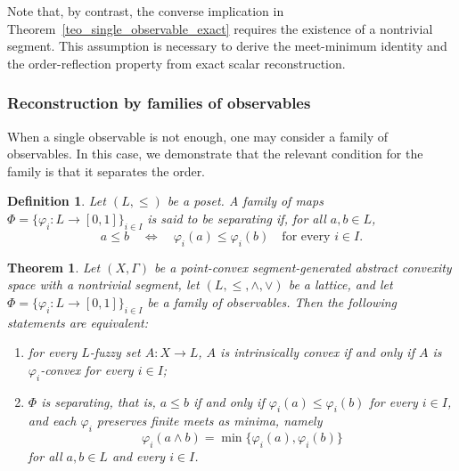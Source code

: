 \documentclass[11pt,a4paper]{article}
\newtheorem{theorem}{Theorem}
\newtheorem{definition}{Definition}
\begin{document}
Note that, by contrast, the converse implication in Theorem~\ref{teo_single_observable_exact} requires the existence of a nontrivial segment. This assumption is necessary to derive the meet-minimum identity and the order-reflection property from exact scalar reconstruction.









\subsubsection{Reconstruction by families of observables}

\smallskip

When a single observable is not enough, one may consider a family of observables. In this case, we demonstrate that the relevant condition for the family is that it separates the order.

\begin{definition}\label{def_separating}
Let \((L,\leq)\) be a poset. A family of maps \(\Phi=\{\varphi_i:L\to[0,1]\}_{i\in I}\) is said to be \emph{separating} if, for all \(a,b\in L\),
\begin{equation*}
a\le b
\quad\Longleftrightarrow\quad
\varphi_i(a)\le \varphi_i(b)\quad\text{for every }i\in I.
\end{equation*}
\end{definition}



\begin{theorem}\label{teo_exact_family}
Let \((X,\Gamma)\) be a point-convex segment-generated abstract convexity space with a nontrivial segment, let \((L,\leq,\wedge,\vee)\) be a lattice, and let \(\Phi=\{\varphi_i:L\to[0,1]\}_{i\in I}\) be a family of observables. Then the following statements are equivalent:
\begin{enumerate}
    \item for every \(L\)-fuzzy set \(A:X\to L\), \(A\) is intrinsically convex if and only if \(A\) is \(\varphi_i\)-convex for every \(i\in I\);
    \item \(\Phi\) is separating, that is, \(a\leq b\) if and only if \(\varphi_i(a)\leq\varphi_i(b)\) for every \(i\in I\), and each \(\varphi_i\) preserves finite meets as minima, namely
    \[
    \varphi_i(a\wedge b)=\min\{\varphi_i(a),\varphi_i(b)\}
    \]
    for all \(a,b\in L\) and every \(i\in I\).
\end{enumerate}
\end{theorem}
\end{document}
